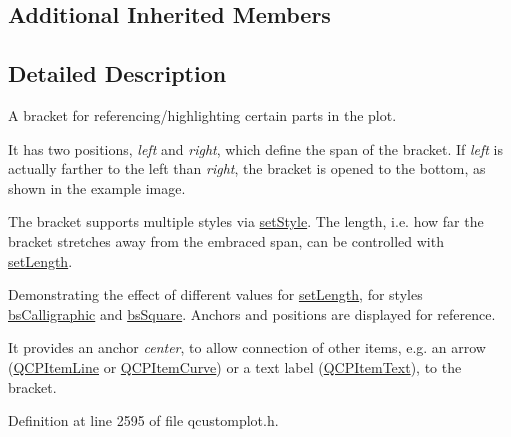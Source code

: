 \subsection*{Additional Inherited Members}


\subsection{Detailed Description}
A bracket for referencing/highlighting certain parts in the plot. 

 It has two positions, {\itshape left} and {\itshape right}, which define the span of the bracket. If {\itshape left} is actually farther to the left than {\itshape right}, the bracket is opened to the bottom, as shown in the example image.

The bracket supports multiple styles via \hyperlink{class_q_c_p_item_bracket_a612dffa2373422eef8754d690add3703}{set\-Style}. The length, i.\-e. how far the bracket stretches away from the embraced span, can be controlled with \hyperlink{class_q_c_p_item_bracket_ac7cfc3da7da9b5c5ac5dfbe4f0351b2a}{set\-Length}.

 \begin{center}Demonstrating the effect of different values for \hyperlink{class_q_c_p_item_bracket_ac7cfc3da7da9b5c5ac5dfbe4f0351b2a}{set\-Length}, for styles \hyperlink{class_q_c_p_item_bracket_a7ac3afd0b24a607054e7212047d59dbda8f29f5ef754e2dc9a9efdedb2face0f3}{bs\-Calligraphic} and \hyperlink{class_q_c_p_item_bracket_a7ac3afd0b24a607054e7212047d59dbda7f9df4a7359bfe3dac1dbe4ccf5d220c}{bs\-Square}. Anchors and positions are displayed for reference.\end{center} 

It provides an anchor {\itshape center}, to allow connection of other items, e.\-g. an arrow (\hyperlink{class_q_c_p_item_line}{Q\-C\-P\-Item\-Line} or \hyperlink{class_q_c_p_item_curve}{Q\-C\-P\-Item\-Curve}) or a text label (\hyperlink{class_q_c_p_item_text}{Q\-C\-P\-Item\-Text}), to the bracket. 

Definition at line 2595 of file qcustomplot.\-h.




